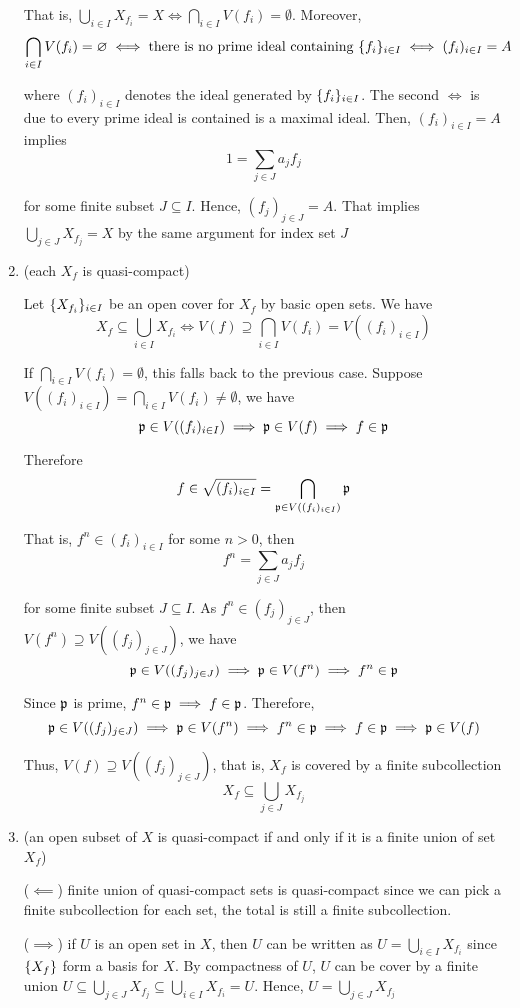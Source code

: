 \begin{longproof}
\begin{enumerate}
		That is, $\bigcup_{i \in I} X_{f_i} = X \iff \bigcap_{i \in I} V(f_i) = \emptyset$. Moreover, 
		$$
			\bigcap_{i \in I} V(f_i) = \varnothing \iff \text{there is no prime ideal containing } \{f_i\}_{i \in I} \iff (f_i)_{i \in I} = A
		$$
		
		where $(f_i)_{i \in I}$ denotes the ideal generated by $\{f_i\}_{i \in I}$. The second $\iff$ is due to every prime ideal is contained is a maximal ideal. Then, $(f_i)_{i \in I} = A$ implies
		$$
			1 = \sum_{j \in J} a_j f_j
		$$
		
		for some finite subset $J \subseteq I$. Hence, $(f_j)_{j \in J} = A$. That implies $\bigcup_{j \in J} X_{f_j} = X$ by the same argument for index set $J$
		
		\item (each $X_f$ is quasi-compact)
		
		Let $\{X_{f_i}\}_{i \in I}$ be an open cover for $X_f$ by basic open sets. We have
		$$
			X_f \subseteq \bigcup_{i \in I} X_{f_i} \iff V(f) \supseteq \bigcap_{i \in I} V(f_i) = V((f_i)_{i \in I})
		$$
		
		If $\bigcap_{i \in I} V(f_i) = \emptyset$, this falls back to the previous case. Suppose $V((f_i)_{i \in I}) = \bigcap_{i \in I} V(f_i) \neq \emptyset$, we have
		$$
			\mathfrak{p} \in V((f_i)_{i \in I}) \implies \mathfrak{p} \in V(f) \implies f \in \mathfrak{p}
		$$
		
		Therefore
		$$
			f \in \sqrt{(f_i)_{i \in I}} = \bigcap_{\mathfrak{p} \in V((f_i)_{i \in I})} \mathfrak{p}
		$$
		
		That is, $f^n \in (f_i)_{i \in I}$ for some $n > 0$, then
		$$
			f^n = \sum_{j \in J} a_j f_j
		$$
		
		for some finite subset $J \subseteq I$. As $f^n \in (f_j)_{j \in J}$, then $V(f^n) \supseteq V((f_j)_{j \in J})$, we have
		$$
			\mathfrak{p} \in V((f_j)_{j \in J}) \implies \mathfrak{p} \in V(f^n) \implies f^n \in \mathfrak{p}
		$$
		
		Since $\mathfrak{p}$ is prime, $f^n \in \mathfrak{p} \implies f \in \mathfrak{p}$. Therefore,
		$$
			\mathfrak{p} \in V((f_j)_{j \in J}) \implies \mathfrak{p} \in V(f^n) \implies f^n \in \mathfrak{p} \implies f \in \mathfrak{p} \implies \mathfrak{p} \in V(f)
		$$
		
		Thus, $V(f) \supseteq V((f_j)_{j \in J})$, that is, $X_f$ is covered by a finite subcollection
		$$
				X_f \subseteq \bigcup_{j \in J} X_{f_j}
		$$
		
		\item (an open subset of $X$ is quasi-compact if and only if it is a finite union of set $X_f$)
		
		($\impliedby$) finite union of quasi-compact sets is quasi-compact since we can pick a finite subcollection for each set, the total is still a finite subcollection.
		
		($\implies$) if $U$ is an open set in $X$, then $U$ can be written as $U = \bigcup_{i \in I} X_{f_i}$ since $\{X_f\}$ form a basis for $X$. By compactness of $U$, $U$ can be cover by a finite union $U \subseteq \bigcup_{j \in J} X_{f_j} \subseteq \bigcup_{i \in I} X_{f_i} = U$. Hence, $U = \bigcup_{j \in J} X_{f_j}$
		
	\end{enumerate}
\end{longproof}

